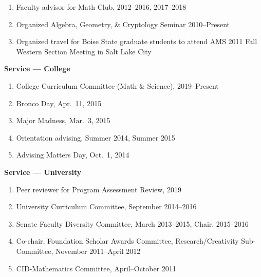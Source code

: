 \documentclass[12pt]{article}
\begin{document}
\begin{enumerate}[revarabic]
\item Faculty advisor for Math Club, 2012--2016, 2017--2018

\item Organized Algebra, Geometry, \& Cryptology Seminar 2010--Present

\item Organized travel for Boise State graduate students to attend AMS 2011 Fall Western Section Meeting in Salt Lake City

\end{enumerate}

\textbf{Service --- College}
\begin{enumerate}[revarabic]
\item College Curriculum Committee (Math \& Science), 2019--Present

\item Bronco Day, Apr.\ 11, 2015
\item Major Madness, Mar.\ 3, 2015
\item Orientation advising, Summer 2014, Summer 2015
\item Advising Matters Day, Oct.\ 1, 2014
\end{enumerate}


\textbf{Service --- University}
\begin{enumerate}[revarabic]
\item Peer reviewer for Program Assessment Review, 2019

\item University Curriculum Committee, September 2014--2016

\item Senate Faculty Diversity Committee, March 2013--2015, Chair, 2015--2016

\item Co-chair, Foundation Scholar Awards Committee, Research/Creativity Sub-Committee, Nov\-ember 2011--April 2012

\item CID-Mathematics Committee, April--October 2011
\end{enumerate}
\end{document}
